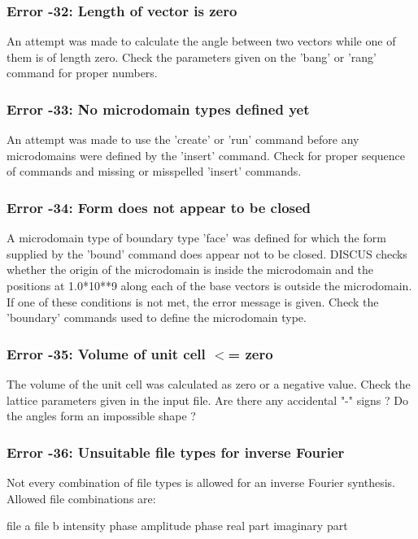 \subsubsection{Error -32: Length of vector is zero}
\par
An attempt was made to calculate the angle between two vectors 
while one of them is of length zero. Check the parameters given 
on the 'bang' or 'rang' command for proper numbers. 
\subsubsection{Error -33: No microdomain types defined yet}
\par
An attempt was made to use the 'create' or 'run' command before 
any microdomains were defined by the 'insert' command. Check for 
proper sequence of commands and missing or misspelled 'insert' commands. 
\subsubsection{Error -34: Form does not appear to be closed}
\par
A microdomain type of boundary type 'face' was defined for which 
the form supplied by the 'bound' command does appear not to be closed. 
DISCUS checks whether the origin of the microdomain is inside the 
microdomain and the positions at 1.0*10**9 along each of the base 
vectors is outside the microdomain. If one of these conditions is 
not met, the error message is given. Check the 'boundary' commands 
used to define the microdomain type. 
\subsubsection{Error -35: Volume of unit cell $ <$= zero}
\par
The volume of the unit cell was calculated as zero or a negative 
value. 
Check the lattice parameters given in the input file. Are there 
any accidental "-" signs ? Do the angles form an impossible shape ? 
\subsubsection{Error -36: Unsuitable file types for inverse Fourier}
\par
Not every combination of file types is allowed for an inverse 
Fourier synthesis. Allowed file combinations are: 
\par
\begin{MacVerbatim}
  file  a     file b
  intensity   phase
  amplitude   phase
  real part   imaginary part
\end{MacVerbatim}
